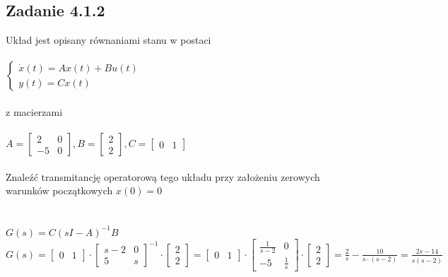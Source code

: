 \subsection*{Zadanie 4.1.2} {\color{darkgray}
	Układ jest opisany równaniami stanu w postaci\\\\
	$\begin{cases} \dot{x}(t)=Ax(t)+Bu(t)\\y(t)=Cx(t)\end{cases}$\\\\
	z macierzami\\\\
	$A=\left[\begin{array}{cc}2&0\\-5&0\end{array}\right],
	B=\left[\begin{array}{c}2\\2\end{array}\right],
	C=\left[\begin{array}{cc}0&1\end{array}\right]$\\\\
	Znaleźć transmitancję operatorową tego układu przy założeniu zerowych warunków początkowych $x(0)=0$\\
}\lineh
\\\\
$G(s)=C(sI-A)^{-1}B$\\
$G(s)=\left[\begin{array}{cc}0&1\end{array}\right]
\cdot
\left[\begin{array}{cc}{s-2}&0\\5&s\end{array}\right]^{-1}
\cdot
\left[\begin{array}{c}2\\2\end{array}\right]=\left[\begin{array}{cc}0&1\end{array}\right]
\cdot 
\left[\begin{array}{cc}{\frac{1}{s-2}}&0\\-5&\frac{1}{s}\end{array}\right]
\cdot
\left[\begin{array}{c}2\\2\end{array}\right]=\frac{2}{s}-\frac{10}{s\cdot(s-2)}=\frac{2s-14}{s\dot{(s-2)}}
$

